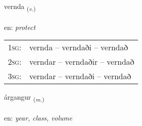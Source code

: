\documentclass[frontgrid, backgrid]{flacards}\usepackage[]{graphicx}\usepackage[]{color}
\begin{document}
\renewcommand{\flhead}{\vskip5pt \fboxsep=0pt {\small\bfseries\footnotesize Sagnorð | Verb}}
\renewcommand{\fcfoot}{\vskip5pt \fboxsep=0pt \hspace{2pt}{\small\bfseries\footnotesize 2K}}

\renewcommand{\blhead}{\vskip5pt {\small\bfseries\footnotesize Sagnorð | Verb }}
\renewcommand{\bcfoot}{\vskip5pt \hspace{2pt}{\small\bfseries\footnotesize 2K}}


{vernda \small{\textsubscript{(\textit{v.})}} \\[1ex] %
\textphonetic{[vɛrnta]} \\
en: \emph{protect} \\  [2ex]
\renewcommand*{\arraystretch}{0.8}
\begin{tabular}{p{1cm}l}
\textsc{1sg}: & vernda -- verndaði -- verndað \\ 
\textsc{2sg}: & verndar -- verndaðir -- verndað \\ 
\textsc{3sg}: & verndar -- verndaði -- verndað \\ 
\end{tabular}
}

\renewcommand{\flhead}{\vskip5pt \fboxsep=0pt {\small\bfseries\footnotesize Nafnorð | Noun}}
\renewcommand{\fcfoot}{\vskip5pt \fboxsep=0pt \hspace{2pt}{\small\bfseries\footnotesize 2K}}

\renewcommand{\blhead}{\vskip5pt {\small\bfseries\footnotesize Nafnorð | Noun }}
\renewcommand{\bcfoot}{\vskip5pt \hspace{2pt}{\small\bfseries\footnotesize 2K}}


{árgangur \small{\textsubscript{(\textit{m.})}} \\[1ex] %
\textphonetic{[aurkauŋkʏr]} \\
en: \emph{year, class, volume} \\  [2ex]
\renewcommand*{\arraystretch}{0.8}
}
\end{document}
